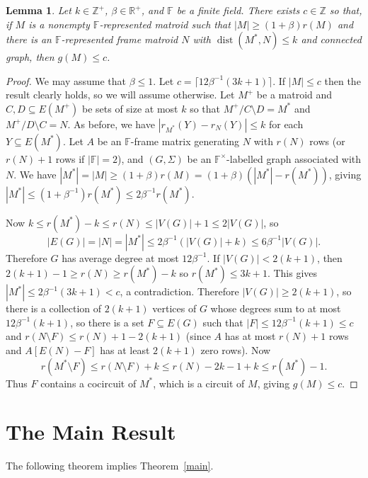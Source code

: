 \documentclass[12pt]{amsart}
\newtheorem{lemma}[theorem]{Lemma}
\theoremstyle{definition}
\newcommand{\bF}{\mathbb F}
\newcommand{\bR}{\mathbb R}
\newcommand{\bZ}{\mathbb Z}
\DeclareMathOperator{\dist}{dist}
\newcommand{\del}{\!\setminus\!}
\newcommand{\con}{/}
\begin{document}
  \begin{lemma}\label{nearcoframe}
    Let $k \in \bZ^+$, $\beta \in \bR^+$, and $\bF$ be a finite field. There exists $c \in \bZ$ so that, if $M$ is a nonempty $\bF$-represented matroid such that  $|M| \ge (1+\beta) r(M)$ and there is an $\bF$-represented frame matroid $N$ with $\dist(M^*,N) \le k$ and connected graph, then $g(M) \le c$.  
  \end{lemma}
  \begin{proof}
    We may assume that $\beta \le 1$. Let $c = \lceil 12 \beta^{-1}(3k+1) \rceil$. If $|M| \le c$ then the result clearly holds, so we will assume otherwise. Let $M^+$ be a matroid and $C,D \subseteq E(M^+)$ be sets of size at most $k$ so that $M^+ \con C \del D = M^*$ and $M^+ \con D \del C = N$. As before, we have $|r_{M^*}(Y)-r_N(Y)| \le k$ for each $Y \subseteq E(M^*)$. Let $A$ be an $\bF$-frame matrix generating $N$ with $r(N)$ rows (or $r(N)+1$ rows if $|\bF| = 2$), and $(G,\Sigma)$ be an $\bF^{\times}$-labelled graph associated with $N$.  We have $|M^*| = |M| \ge (1+\beta)r(M) = (1+\beta)(|M^*| - r(M^*))$, giving $|M^*| \le (1 + \beta^{-1})r(M^*) \le 2\beta^{-1}r(M^*)$.  
    
    Now $k \le r(M^*)-k \le r(N) \le |V(G)|+1 \le 2|V(G)|$, so 
    \[|E(G)| = |N| = |M^*| \le 2\beta^{-1}(|V(G)|+k) \le 6\beta^{-1}|V(G)|.\] 
    Therefore $G$ has average degree at most $12\beta^{-1}$. If $|V(G)| < 2(k+1)$, then $2(k+1)-1 \ge r(N) \ge r(M^*)-k$ so $r(M^*) \le 3k+1$. This gives $|M^*| \le 2\beta^{-1}(3k+1) < c$, a contradiction.  Therefore $|V(G)| \ge 2(k+1)$, so there is a collection of $2(k+1)$ vertices of $G$ whose degrees sum to at most $12\beta^{-1}(k+1)$, so there is a set $F \subseteq E(G)$ such that $|F| \le 12\beta^{-1}(k+1) \le c$ and $r(N \del F) \le r(N)+1 - 2(k+1)$ (since $A$ has at most $r(N)+1$ rows and $A[E(N)-F]$ has at least $2(k+1)$ zero rows). Now
    \[r(M^* \del F) \le r(N \del F) + k \le r(N) - 2k -1 +k \le r(M^*) -1.\]
    Thus $F$ contains a cocircuit of $M^*$, which is a circuit of $M$, giving $g(M) \le c$. 
    
  \end{proof}
  
  \section{The Main Result} 
  
  The following theorem implies Theorem~\ref{main}.
  
\end{document}
